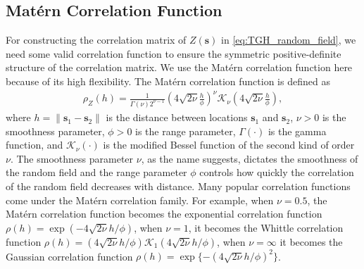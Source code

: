 \documentclass[conference]{IEEEtran}
\begin{document}
\subsection{Mat\'ern Correlation Function}
For constructing the correlation matrix of $Z(\bm s)$ in \eqref{eq:TGH_random_field}, we need some valid correlation
function to ensure the symmetric positive-definite structure of the correlation matrix. We use the Mat\'ern correlation function 
here because of its high flexibility. The Mat\'ern correlation 
function is defined as
\begin{equation}
\begin{split}
\rho_Z(h)=\frac{1}{\Gamma(\nu)2^{\nu-1}}\left( 4 \sqrt{2\nu}\frac{h}{\phi}\right)^{\nu}\mathcal{K}_{\nu}\left(4 \sqrt{2\nu} \frac{h}{\phi}\right),
\end{split}
\label{eq:matern}
\end{equation}
where $h = \|\bm{s}_1-\bm{s}_2\|$ is the distance between 
locations $\bm s_1$ and $\bm s_2$, $\nu>0$ is the smoothness parameter, $\phi>0$ is the range parameter, $\Gamma(\cdot)$ is the gamma function, and $\mathcal{K}_\nu(\cdot)$ is the 
modified Bessel function of the second kind of order $\nu$. The smoothness parameter $\nu$, as the name suggests, dictates the smoothness of the random field and the range parameter $\phi$ controls how quickly the correlation of the random field decreases 
with distance. Many popular correlation functions come 
under the Mat\'ern correlation family. For example, when $\nu = 0.5$, the Mat\'ern correlation function becomes the exponential
 correlation function $\rho(h) = \exp(- 4 \sqrt{2 \nu} h/ \phi)$,  when $\nu = 1$, it becomes the Whittle correlation function $\rho(h) = \left( 4 \sqrt{2\nu}{h}/{\phi}\right)\mathcal{K}_{1}\left(4 \sqrt{2\nu} {h}/{\phi}\right)$, when $\nu = \infty$ it becomes the Gaussian 
 correlation function $\rho(h) = \exp\{-( 4 \sqrt{2 \nu} h/ \phi)^2\}$. 

\end{document}

